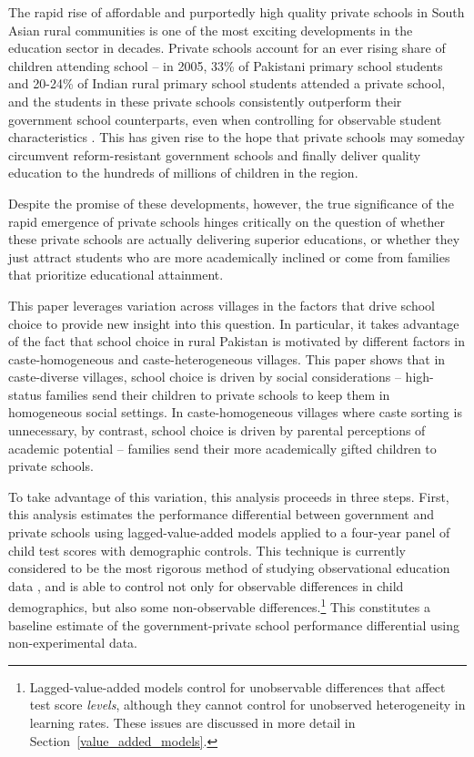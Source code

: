\documentclass[Eubank_pk_ethnic_sorting.tex]{subfiles}
\begin{document}
The rapid rise of affordable and purportedly high quality private schools in South Asian rural communities is one of the most exciting developments in the education sector in decades. Private schools account for an ever rising share of children attending school -- in 2005, 33\% of Pakistani primary school students and 20-24\% of Indian rural primary school students attended a private school, and the students in these private schools consistently outperform their government school counterparts, even when controlling for observable student characteristics \citep{Jimenez:1991wa, Jimenez:1995vg, Pratham:2005vw, Andrabi:2011hl, Desai:2009ty, Tooley:2003vf, Alderman:2003we, Alderman:2001wk}. This has given rise to the hope that private schools may someday circumvent reform-resistant government schools and finally deliver quality education to the hundreds of millions of children in the region.

Despite the promise of these developments, however, the true significance of the rapid emergence of private schools hinges critically on the question of whether these private schools are actually delivering superior educations, or whether they just attract students who are more academically inclined or come from families that prioritize educational attainment. 

This paper leverages variation across villages in the factors that drive school choice to provide new insight into this question. In particular, it takes advantage of the fact that school choice in rural Pakistan is motivated by different factors in caste-homogeneous and caste-heterogeneous villages. This paper shows that in caste-diverse villages, school choice is driven by social considerations -- high-status families send their children to private schools to keep them in homogeneous social settings. In caste-homogeneous villages where caste sorting is unnecessary, by contrast, school choice is driven by parental perceptions of academic potential -- families send their more academically gifted children to private schools. 

To take advantage of this variation, this analysis proceeds in three steps. First, this analysis estimates the performance differential between government and private schools using lagged-value-added models applied to a four-year panel of child test scores with demographic controls. This technique is currently considered to be the most rigorous method of studying observational education data \citep{Gordon:2006wt,McCaffrey:2003vk,Hanushek:2003hz}, and is able to control not only for observable differences in child demographics, but also some non-observable differences.\footnote{Lagged-value-added models control for unobservable differences that affect test score \emph{levels}, although they cannot control for unobserved heterogeneity in learning rates. These issues are discussed in more detail in Section~\ref{value_added_models}.} This constitutes a baseline estimate of the government-private school performance differential using non-experimental data.
\end{document}
